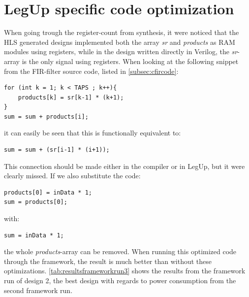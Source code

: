 \section{LegUp specific code optimization}

When going trough the register-count from synthesis, it were noticed that the HLS generated designs implemented both the array \textit{sr} and \textit{products} as RAM modules using registers, while in the design written directly in Verilog, the \textit{sr}-array is the only signal using registers. When looking at the following snippet from the FIR-filter source code, listed in \cref{subsec:cfircode}:
\lstset{language=C,style=CStyle}
\begin{lstlisting}
for (int k = 1; k < TAPS ; k++){
    products[k] = sr[k-1] * (k+1);
}
sum = sum + products[i];
\end{lstlisting}
it can easily be seen that this is functionally equivalent to:
\begin{lstlisting}
sum = sum + (sr[i-1] * (i+1));
\end{lstlisting}
This connection should be made either in the compiler or in LegUp, but it were clearly missed. If we also substitute the code:
\begin{lstlisting}
products[0] = inData * 1;
sum = products[0];
\end{lstlisting}
with:
\begin{lstlisting}
sum = inData * 1;
\end{lstlisting}
the whole \textit{products}-array can be removed. When running this optimized code through the framework, the result is much better than without these optimizations. \cref{tab:resultsframeworkrun3} shows the results from the framework run of design 2, the best design with regards to power consumption from the second framework run.


